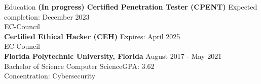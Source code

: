 \documentclass{resume} %
\begin{document}

\begin{rSection}{Education}
{\bf (In progress) Certified Penetration Tester (CPENT)} \hfill {Expected completion: December 2023}
\\ EC-Council \\
{\bf Certified Ethical Hacker (CEH)} \hfill {Expires: April 2025}
\\ EC-Council \\
{\bf Florida Polytechnic University, Florida} \hfill {August 2017 - May 2021} 
\\ Bachelor of Science Computer Science\hfill {GPA: 3.62}
\\ Concentration: Cybersecurity
\end{rSection}





\end{document}
